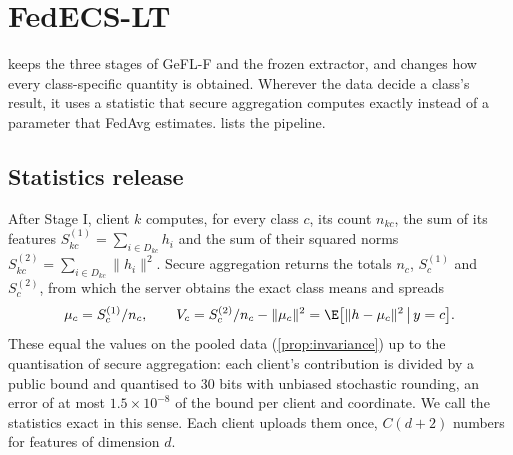 \section{FedECS-LT}\label{sec:method}

\ours keeps the three stages of GeFL-F and the frozen extractor, and changes how every class-specific quantity is
obtained. Wherever the data decide a class's result, it uses a statistic that secure aggregation computes exactly
instead of a parameter that FedAvg estimates.  lists the pipeline.


\subsection{Statistics release}\label{sec:method-stats}

After Stage I, client $k$ computes, for every class $c$, its count $n_{kc}$, the sum of its features
$S^{(1)}_{kc}=\sum_{i\in D_{kc}}h_i$ and the sum of their squared norms $S^{(2)}_{kc}=\sum_{i\in D_{kc}}\|h_i\|^2$.
Secure aggregation returns the totals $n_c$, $S^{(1)}_c$ and $S^{(2)}_c$, from which the server obtains the exact class
means and spreads
\begin{equation}\label{eq:moments}
\mu_c=S^{(1)}_c/n_c,\qquad V_c=S^{(2)}_c/n_c-\|\mu_c\|^2=\E\big[\|h-\mu_c\|^2\,\big|\,y=c\big].
\end{equation}
These equal the values on the pooled data (\cref{prop:invariance}) up to the quantisation of secure aggregation:
each client's contribution is divided by a public bound and quantised to 30 bits with unbiased stochastic rounding,
an error of at most $1.5\times10^{-8}$ of the bound per client and coordinate. We call the statistics exact in this
sense. Each client uploads them once, $C(d+2)$ numbers for features of dimension $d$.

